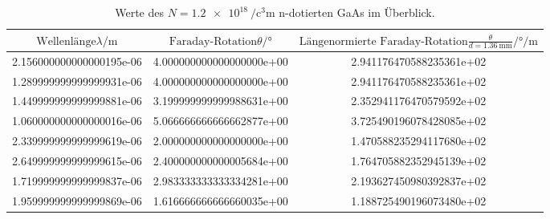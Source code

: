 \begin{table}
 \centering
 \begin{tabular}{S[scientific-notation=fixed, fixed-exponent =-6] S[scientific-notation=fixed, fixed-exponent = 0] S[scientific-notation=fixed, fixed-exponent = 0]}
   \toprule
   $\text{Wellenlänge} \lambda / \si{\meter}$ & $ \text{Faraday-Rotation} \theta / \si{\degree}$ &$ \text{Längenormierte Faraday-Rotation} \frac{\theta}{d=\SI{1.36}{\milli\meter}} / \si{\degree\per\meter}$ \\

   \midrule
    2.156000000000000195e-06 & 4.000000000000000000e+00 & 2.941176470588235361e+02\\
    1.289999999999999931e-06 & 4.000000000000000000e+00 & 2.941176470588235361e+02\\
    1.449999999999999881e-06 & 3.199999999999988631e+00 & 2.352941176470579592e+02\\
    1.060000000000000016e-06 & 5.066666666666662877e+00 & 3.725490196078428085e+02\\
    2.339999999999999619e-06 & 2.000000000000000000e+00 & 1.470588235294117680e+02\\
    2.649999999999999615e-06 & 2.400000000000005684e+00 & 1.764705882352945139e+02\\
    1.719999999999999837e-06 & 2.983333333333334281e+00 & 2.193627450980392837e+02\\
    1.959999999999999869e-06 & 1.616666666666660035e+00 & 1.188725490196073480e+02\\
   \bottomrule
 \end{tabular}
  \caption{Werte des \texorpdfstring{$N = \SI{1.2e18}{\per\cubic\centi\meter}$}{math} n-dotierten GaAs im Überblick.}
  \label{tab:2.nGaAstab}
\end{table}

